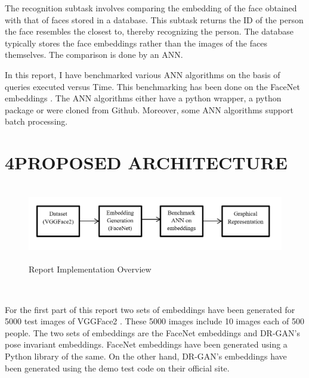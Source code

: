 \documentclass[12pt]{article}
\renewcommand{\_}{\kern-1.5pt\textunderscore\kern-1.5pt}
\begin{document}
\begin{justify}
The recognition subtask involves comparing the embedding of the face obtained with that of faces stored in a database. This subtask returns the ID of the person the face resembles the closest to, thereby recognizing the person. The database typically stores the face embeddings rather than the images of the faces themselves. The comparison is done by an ANN.
\end{justify}\par

In this report, I have benchmarked various ANN algorithms on the basis of queries executed versus Time. This benchmarking has been done on the FaceNet embeddings \cite{schroff2015facenet} . The ANN algorithms either have a python wrapper, a python package or were cloned from Github. Moreover, some ANN algorithms support batch processing.\par

\section*{4\hspace*{10pt}PROPOSED ARCHITECTURE}




\begin{figure}[H]
	\begin{FlushLeft}		\includegraphics[width=6.27in,height=1.32in]{./media/image1.png}
		\caption{Report Implementation Overview}
		\label{fig:Report_Implementation_Overview}
	\end{FlushLeft}\end{figure}



\\

\begin{justify}
For the first part of this report two sets of embeddings have been generated for 5000 test images of VGGFace2 \cite{cao2018vggface2}. These 5000 images include 10 images each of 500 people. The two sets of embeddings are the FaceNet embeddings \cite{schroff2015facenet}  and DR-GAN’s pose invariant embeddings. FaceNet embeddings \cite{schroff2015facenet}  have been generated using a Python library of the same. On the other hand, DR-GAN’s embeddings have been generated using the demo test code on their official site.
\end{justify}\par
\end{document}
